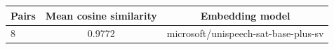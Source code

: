 \begin{tabularx}{\textwidth}{lcc}
  \hline
  Pairs & Mean cosine similarity & Embedding model \\
  \hline
  8 & 0.9772 & microsoft/unispeech-sat-base-plus-sv \\
  \hline
\end{tabularx}
